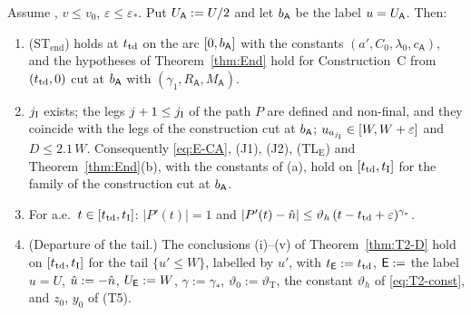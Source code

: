 \begin{lemma}[Stage A]\label{lem:T2-StA}
Assume \MHT, $v\le v_0$, $\varepsilon\le\varepsilon_*$. Put $U_{\mathsf A}:=U/2$ and let $b_{\mathsf A}$ be the label $u=U_{\mathsf A}$. Then:
\begin{enumerate}
\item[(a)] \textup{(ST$_{\mathrm{end}}$)} holds at $t_{\mathrm{td}}$ on the arc $[0,b_{\mathsf A}]$ with the constants
$(a',C_0,\lambda_0,c_{\mathsf A})$, and the hypotheses of Theorem~\ref{thm:End} hold for Construction~C from $(t_{\mathrm{td}},0)$ cut at
$b_{\mathsf A}$ with $(\gamma_1,R_{\mathsf A},M_{\mathsf A})$.
\item[(b)] $j_{\mathrm I}$ exists; the legs $j+1\le j_{\mathrm I}$ of the path $P$ are defined and non-final, and they coincide with the legs of the
construction cut at $b_{\mathsf A}$; $u_{a_{j_{\mathrm I}}}\in[W,W+\varepsilon]$ and $D\le2.1\,W$. Consequently \eqref{eq:E-CA}, (J1), (J2), (TL$_{\mathrm E}$)
and Theorem~\ref{thm:End}(b), with the constants of \textup{(a)}, hold on $[t_{\mathrm{td}},t_{\mathrm I}]$ for the family of the construction cut at
$b_{\mathsf A}$.
\item[(c)] For a.e.\ $t\in[t_{\mathrm{td}},t_{\mathrm I}]$: $|P'(t)|=1$ and $|P'(t)-\hat n|\le\vartheta_h\,(t-t_{\mathrm{td}}+\varepsilon)^{\gamma_*}$.
\item[(d)] \textup{(Departure of the tail.)} The conclusions \textup{(i)--(v)} of Theorem~\ref{thm:T2-D} hold on $[t_{\mathrm{td}},t_{\mathrm I}]$ for
the tail $\{u'\le W\}$, labelled by $u'$, with $t_{\mathsf E}:=t_{\mathrm{td}}$, $\mathsf E:=$ the label $u=U$, $\hat u:=-\hat n$, $U_{\mathsf E}:=W$, $\gamma:=\gamma_*$,
$\vartheta_0:=\vartheta_{\mathrm T}$, the constant $\vartheta_h$ of \eqref{eq:T2-const}, and $z_0$, $y_0$ of \textup{(T5)}.
\end{enumerate}
\end{lemma}
